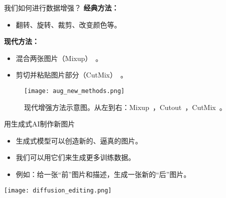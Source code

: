 \begin{refsection}
\begin{frame}{我们如何进行数据增强？}
  \textbf{经典方法：}
  \begin{itemize}
    \item 翻转、旋转、裁剪、改变颜色等。
  \end{itemize}
  \textbf{现代方法：}
  \begin{itemize}
    \item 混合两张图片（Mixup）~\parencite{zhangMixupEMPIRICALRISK2018}。
    \item 剪切并粘贴图片部分（CutMix）~\parencite{yunCutMixRegularizationStrategy2019}。
  \end{itemize}
  \begin{figure}
    \centering
    \texttt{[image: aug\_new\_methods.png]}
    \caption[]{\scriptsize 现代增强方法示意图。从左到右：Mixup~\parencite{zhangMixupEMPIRICALRISK2018}，Cutout~\parencite{devriesImprovedRegularizationConvolutional2017}，CutMix~\parencite{yunCutMixRegularizationStrategy2019}。}
  \end{figure}
  \bottomleftrefs
\end{frame}
\end{refsection}


\begin{refsection}
\begin{frame}{用生成式AI制作新图片}
  \begin{itemize}
    \item 生成式模型可以创造新的、逼真的图片。
    \item 我们可以用它们来生成更多训练数据。
    \item 例如：给一张“前”图片和描述，生成一张新的“后”图片。
  \end{itemize}
  \centering
  \texttt{[image: diffusion\_editing.png]}
\end{frame}
\end{refsection}

